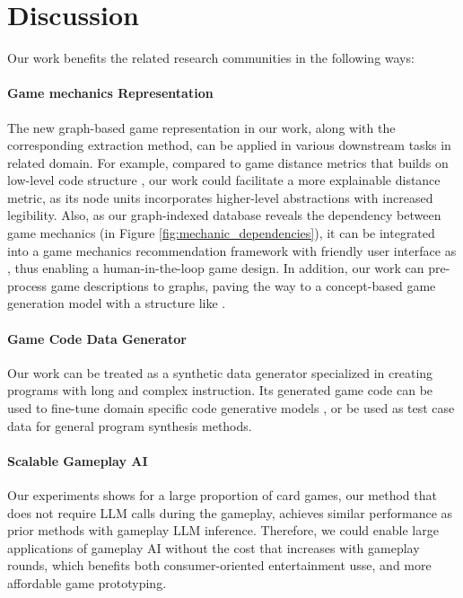 \section{Discussion}
Our work benefits the related research communities in the following ways: 

\paragraph{Game mechanics Representation}
The new graph-based game representation in our work, along with the corresponding extraction method, can be applied in various downstream tasks in related domain. For example, compared to game distance metrics that builds on low-level code structure \cite{distancemapping2021}, our work could facilitate a more explainable distance metric, as its node units incorporates higher-level abstractions with increased legibility. Also, as our graph-indexed database reveals the dependency between game mechanics (in Figure \ref{fig:mechanic_dependencies}), it can be integrated into a game mechanics recommendation framework with friendly user interface as \cite{pitako}, thus enabling a human-in-the-loop game design. In addition, our work can pre-process game descriptions to graphs, paving the way to a concept-based game generation model with a structure like \cite{lcmteam2024largeconceptmodelslanguage}.


\paragraph{Game Code Data Generator} Our work can be treated as a synthetic data generator specialized in creating programs with long and complex instruction. Its generated game code can be used to fine-tune domain specific code generative models \cite{wu2024instructiondriven}, or be used as test case data for general program synthesis methods.

\paragraph{Scalable Gameplay AI} 
Our experiments shows for a large proportion of card games, our method that does not require LLM calls during the gameplay, achieves similar performance as prior methods with gameplay LLM inference. Therefore, we could enable large applications of gameplay AI without the cost that increases with gameplay rounds, which benefits both consumer-oriented entertainment usse, and more affordable game prototyping.

